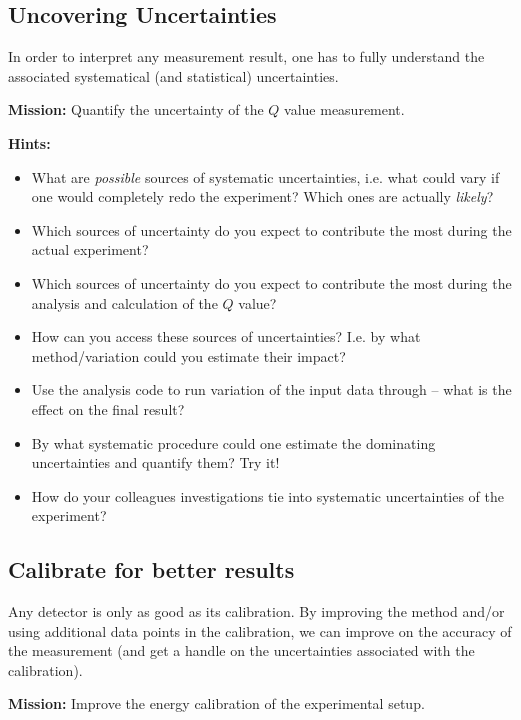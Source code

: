 \documentclass[a4,11pt, notitlepage]{article}
\begin{document}
\subsection{Uncovering Uncertainties}
\label{sec:uncertainties}

In order to interpret any measurement result, one has to fully
understand the associated systematical (and statistical)
uncertainties.

\noindent\textbf{Mission:} Quantify the uncertainty of the $Q$ value measurement.

\noindent\textbf{Hints:}
\begin{itemize}
\item What are \emph{possible} sources of systematic uncertainties, i.e. what
  could vary if one would completely redo the experiment?
  Which ones are actually \emph{likely}?
\item Which sources of uncertainty do you expect to contribute the
  most during the actual experiment?
\item Which sources of uncertainty do you expect to contribute the
  most during the analysis and calculation of the $Q$ value?
\item How can you access these sources of uncertainties? I.e. by what
  method/variation could you estimate their impact?
\item Use the analysis code to run variation of the input data through
  -- what is the effect on the final result?
\item By what systematic procedure could one estimate the dominating
  uncertainties and quantify them? Try it!
\item How do your colleagues investigations tie into systematic
  uncertainties of the experiment?
\end{itemize}


\subsection{Calibrate for better results}
\label{sec:calibrate}

Any detector is only as good as its calibration. By improving the
method and/or using additional data points in the calibration, we can
improve on the accuracy of the measurement (and get a handle on the
uncertainties associated with the calibration).

\noindent\textbf{Mission:} Improve the energy calibration of the experimental setup.
\end{document}
